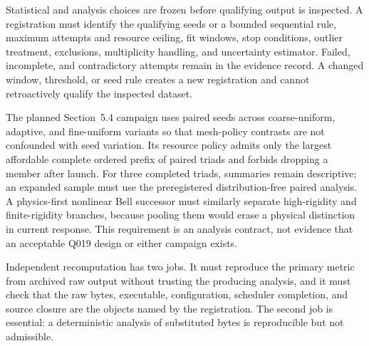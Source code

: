 \documentclass[twocolumn]{aastex701}
\begin{document}
Statistical and analysis choices are frozen before qualifying output is
inspected. A registration must identify the qualifying seeds or a bounded
sequential rule, maximum attempts and resource ceiling, fit windows, stop
conditions, outlier treatment, exclusions, multiplicity handling, and
uncertainty estimator. Failed, incomplete, and contradictory attempts remain
in the evidence record. A changed window, threshold, or seed rule creates a
new registration and cannot retroactively qualify the inspected dataset.

The planned Section~5.4 campaign uses paired seeds across coarse-uniform,
adaptive, and fine-uniform variants so that mesh-policy contrasts are not
confounded with seed variation. Its resource policy admits only the largest
affordable complete ordered prefix of paired triads and forbids dropping a
member after launch. For three completed triads, summaries remain descriptive;
an expanded sample must use the preregistered distribution-free paired
analysis. A physics-first nonlinear Bell successor must similarly separate
high-rigidity and finite-rigidity branches, because pooling them would erase a
physical distinction in current response. This requirement is an analysis
contract, not evidence that an acceptable Q019 design or either campaign
exists.

Independent recomputation has two jobs. It must reproduce the primary metric
from archived raw output without trusting the producing analysis, and it must
check that the raw bytes, executable, configuration, scheduler completion, and
source closure are the objects named by the registration. The second job is
essential: a deterministic analysis of substituted bytes is reproducible but
not admissible.
\end{document}
